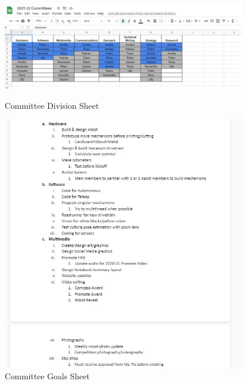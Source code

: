 \begin{figure}[ht]
\centering
\begin{minipage}[b]{.48\textwidth}
	\centering
	\includegraphics[width=0.95\textwidth, angle=0]{Meetings/August/08-10-21/8-10-21_Image2 - Nathan Forrer.JPG}
	\caption{Committee Division Sheet}
	\label{fig:pic2}
\end{minipage}%
\hfill%
\begin{minipage}[b]{.48\textwidth}
	\centering
	\includegraphics[width=0.95\textwidth, angle=0]{Meetings/August/08-10-21/8-10-21_Image3 - Nathan Forrer.JPG}
	\caption{Committee Goals Sheet}
	\label{fig:pic3}
\end{minipage}
\end{figure}

